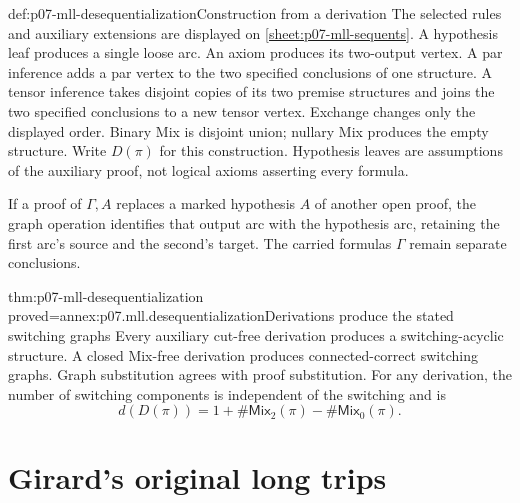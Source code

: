 \begin{hbdefinition}{def:p07-mll-desequentialization}{Construction from a derivation}
The selected rules and auxiliary extensions are displayed on
\cref{sheet:p07-mll-sequents}. A hypothesis leaf produces a single loose
arc. An axiom produces its two-output vertex. A par inference adds a
par vertex to the two specified conclusions of one structure. A tensor
inference takes disjoint copies of its two premise structures and joins
the two specified conclusions to a new tensor vertex. Exchange changes
only the displayed order. Binary Mix is disjoint union; nullary Mix
produces the empty structure. Write \(D(\pi)\) for this construction.
Hypothesis leaves are assumptions of the auxiliary proof, not logical
axioms asserting every formula.

If a proof of \(\Gamma,A\) replaces a marked hypothesis \(A\) of another
open proof, the graph operation identifies that output arc with the
hypothesis arc, retaining the first arc's source and the second's target.
The carried formulas \(\Gamma\) remain separate conclusions.
\end{hbdefinition}

\begin{hbtheorem}{thm:p07-mll-desequentialization}
 {proved=annex:p07.mll.desequentialization}{Derivations produce the stated switching graphs}
Every auxiliary cut-free derivation produces a switching-acyclic structure.
A closed Mix-free derivation produces connected-correct switching graphs.
Graph substitution agrees with proof substitution. For any derivation,
the number of switching components is independent of the switching and is
\[
 d(D(\pi))=1+\#\mathsf{Mix}_2(\pi)-\#\mathsf{Mix}_0(\pi).
\]
\end{hbtheorem}

\section{Girard's original long trips}
\label{sec:p07-mll-original-trips}

